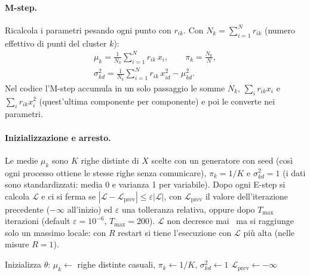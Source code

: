\documentclass[conference]{IEEEtran}
\begin{document}
\paragraph{M-step.} Ricalcola i parametri pesando ogni punto con $r_{ik}$. Con $N_k=\sum_{i=1}^{N}r_{ik}$ (numero effettivo di punti del cluster $k$):
\begin{gather}
\mu_k=\tfrac{1}{N_k}\sum_{i=1}^{N} r_{ik}\,x_i,\qquad
\pi_k=\tfrac{N_k}{N},\\
\sigma^2_{kd}=\tfrac{1}{N_k}\sum_{i=1}^{N} r_{ik}\,x_{id}^2-\mu_{kd}^2.
\end{gather}
Nel codice l'M-step accumula in un solo passaggio le somme $N_k$, $\sum_i r_{ik}x_i$ e $\sum_i r_{ik}x_i^2$ (quest'ultima componente per componente) e poi le converte nei parametri.

\paragraph{Inizializzazione e arresto.} Le medie $\mu_k$ sono $K$ righe distinte di $X$ scelte con un generatore con seed (così ogni processo ottiene le stesse righe senza comunicare), $\pi_k=1/K$ e $\sigma^2_{kd}=1$ (i dati sono standardizzati: media 0 e varianza 1 per variabile). Dopo ogni E-step si calcola $\mathcal{L}$ e ci si ferma se $|\mathcal{L}-\mathcal{L}_{\mathrm{prev}}|\le\varepsilon|\mathcal{L}|$, con $\mathcal{L}_{\mathrm{prev}}$ il valore dell'iterazione precedente ($-\infty$ all'inizio) ed $\varepsilon$ una tolleranza relativa, oppure dopo $T_{\max}$ iterazioni (default $\varepsilon=10^{-6}$, $T_{\max}=200$). $\mathcal{L}$ non decresce mai~\cite[Sez.~9.4]{bishop} ma si raggiunge solo un massimo locale: con $R$ restart si tiene l'esecuzione con $\mathcal{L}$ più alta (nelle misure $R=1$).

\begin{algorithm}[t]
\caption{EM per una mistura di gaussiane (una esecuzione)}\label{alg:em}
\small
{}
Inizializza $\theta$: $\mu_k\leftarrow$ righe distinte casuali, $\pi_k\leftarrow 1/K$, $\sigma^2_{kd}\leftarrow 1$\;
$\mathcal{L}_{\mathrm{prev}}\leftarrow-\infty$\;
\end{algorithm}
\end{document}
